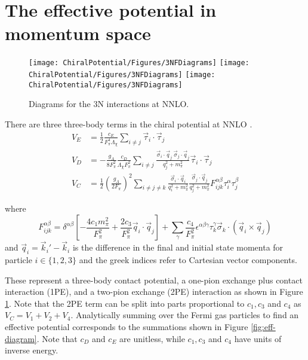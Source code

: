 \section{\label{sec:momentum}The effective potential in momentum space}

\begin{figure}
\centering
\texttt{[image: ChiralPotential/Figures/3NFDiagrams]}
\texttt{[image: ChiralPotential/Figures/3NFDiagrams]}
\texttt{[image: ChiralPotential/Figures/3NFDiagrams]}
\caption{\label{fig:3NF}Diagrams for the 3N interactions at NNLO.}
\end{figure}

There are three three-body terms in the chiral potential at NNLO \cite{PhysRevC.66.064001}. 
\begin{align}
V_E&=\frac{1}{2}\frac{c_E }{F_\pi^4\Lambda_\chi}\sum_{i\neq j} \vec{\tau}_i\cdot\vec{\tau}_j \label{eq:V_E} \\
V_D&=-\frac{ g_A}{8F_\pi^2}\frac{c_D}{\Lambda_\chi F_\pi^2}\sum_{i\neq j } \frac{ \vec{\sigma}_i\cdot\vec{q}_j\:\vec{\sigma}_j\cdot\vec{q}_j }{q^2_j+m_\pi^2} \vec{\tau}_i\cdot\vec{\tau}_j \label{eq:V_D}\\
V_{C} &= \frac{1}{2}\left(\frac{g_A}{2F_\pi}\right)^2\sum_{i\neq j \neq k} \frac{ \vec{\sigma}_i\cdot\vec{q}_i}{q_i^2+m_\pi^2}\frac{\vec{\sigma}_j\cdot\vec{q}_j }{q^2_j+m_\pi^2} F_{ijk}^{\alpha\beta}\tau_i^{\alpha}\tau_j^\beta \label{eq:V_C}
\end{align}

where 
\begin{equation}
F_{ijk}^{\alpha\beta}=\delta^{\alpha \beta}\left[-\frac{4c_1m_\pi^2}{F_\pi^2}+\frac{2c_3}{F_\pi^2}\vec{q}_i\cdot\vec{q}_j\right]+\sum_\gamma\frac{c_4}{F_\pi^2}\epsilon^{\alpha\beta\gamma}\tau^\gamma_k\vec{\sigma}_k\cdot\left(\vec{q}_i\times\vec{q}_j\right)
\end{equation}
and $\vec{q}_i=\vec{k}_i' - \vec{k}_i$ is the difference in the final and initial state momenta for particle $i \in \{1,2,3\}$ and the greek indices refer to Cartesian vector components.

These represent a three-body contact potential, a one-pion exchange plus contact interaction (1PE), and a two-pion exchange (2PE) interaction as shown in Figure \ref{fig:3NF}. Note that the 2PE term can be split into parts proportional to $c_1, c_3$ and $c_4$ as $V_C=V_1+V_2+V_4$. Analytically summing over the Fermi gas particles to find an effective potential corresponds to the summations shown in Figure \ref{fig:eff-diagram}. Note that $c_D$ and $c_E$ are unitless, while $c_1, c_3$ and $c_4$ have units of inverse energy. 

